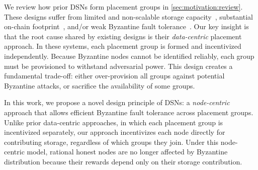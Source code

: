 We review how prior DSNs form placement groups in \cref{sec:motivation:review}.
These designs suffer from limited and non-scalable storage capacity~\cite{permacoin,retricoin,arweave,walrus,bft-dsn,swarm}, substantial on-chain footprint~\cite{filecoin,sia,shelby}, and/or weak Byzantine fault tolerance~\cite{filecoin,sia,shelby,permacoin,retricoin,arweave,walrus,bft-dsn}.
Our key insight is that the root cause shared by existing designs is their \emph{data-centric} placement approach.
In these systems, each placement group is formed and incentivized independently.
Because Byzantine nodes cannot be identified reliably, each group must be provisioned to withstand adversarial power.
This design creates a fundamental trade-off: either over-provision all groups against potential Byzantine attacks, or sacrifice the availability of some groups.

In this work, we propose a novel design principle of DSNs: a \emph{node-centric} approach that allows efficient Byzantine fault tolerance across placement groups.
Unlike prior data-centric approaches, in which each placement group is incentivized separately, our approach incentivizes each node directly for contributing storage, regardless of which groups they join.
Under this node-centric model, rational honest nodes are no longer affected by Byzantine distribution because their rewards depend only on their storage contribution.

